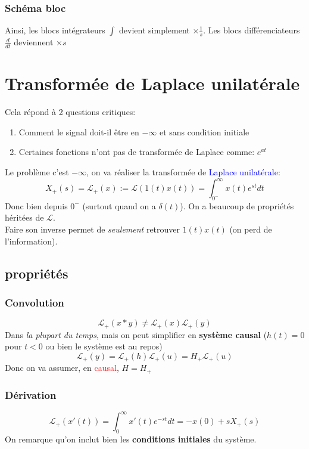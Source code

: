 \documentclass{report}
\begin{document}
\subsubsection{Schéma bloc}
Ainsi, les blocs intégrateurs $\int$ devient simplement $\times \frac{1}{s}$. Les blocs différenciateurs $\frac{d}{dt}$ deviennent $\times s$

\section{Transformée de Laplace unilatérale}
Cela répond à 2 questions critiques:
\begin{enumerate}
\item Comment le signal doit-il être en $- \infty$ et sans condition initiale
\item Certaines fonctions n'ont pas de transformée de Laplace comme: $e^{at}$
\end{enumerate}
Le problème c'est $-\infty$, on va réaliser la transformée de \textcolor{blue}{Laplace unilatérale}:
\begin{equation}
X_+ (s) = \mathcal{L}_+ (x) := \mathcal{L}(1(t) x(t)) = \int_{0^-}^{\infty} x(t) e^{st} dt
\end{equation}
Donc bien depuis $0^-$ (surtout quand on a $\delta (t)$). On a beaucoup de propriétés héritées de $\mathcal{L}$.\\
Faire son inverse permet de \textit{seulement} retrouver \textbf{$1(t) x(t)$} (on perd de l'information).

\subsection{propriétés}
\subsubsection{Convolution} 
\begin{equation}
\mathcal{L}_+ (x \ast y) \neq \mathcal{L}_+ (x) \mathcal{L}_+ (y)
\end{equation} 
Dans \textit{la plupart du temps}, mais on peut simplifier en \textbf{système causal} ($h(t) = 0 $ pour $t < 0$ ou bien le système est au repos)
\begin{equation}
\mathcal{L}_+ (y) = \mathcal{L}_+ (h) \mathcal{L}_+ (u) = H_+ \mathcal{L}_+ (u)
\end{equation}
Donc on va assumer, en \textcolor{red}{causal}, $H = H_+$

\subsubsection{Dérivation} \label{Dérivation}
\begin{equation}
\mathcal{L}_+ (x'(t)) = \int_0^{\infty} x'(t) e^{-st}dt = -x(0) + s X_+ (s)
\end{equation}
On remarque qu'on inclut bien les \textbf{conditions initiales} du système.
\end{document}
